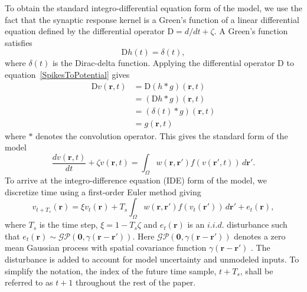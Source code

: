 \documentclass[conference]{IEEEtran}
\begin{document}
To obtain the standard integro-differential equation form of the model, we use the fact that the synaptic response kernel is a Green's function of a linear differential equation defined by the differential operator $\textrm{D}=d/dt + \zeta$. A Green's function satisfies
\begin{equation}
	\label{GreensFuncDef} \textrm{D}h\left( t \right) = \delta \left( t \right), 
\end{equation} 
where $\delta(t)$ is the Dirac-delta function. Applying the differential operator $\textrm{D}$ to equation~\ref{SpikesToPotential} gives
\begin{align}
 \textrm{D}v\left(\mathbf r,t\right)&= \textrm{D}\left(h\ast g\right)\left(\mathbf r,t\right)\\
&=\left(\textrm{D}h\ast g\right)\left(\mathbf r,t\right)\\
&=\left(\delta \left(t\right)\ast g\right)\left(\mathbf r,t\right)\\
&=g\left(\mathbf r,t\right)
\end{align}
where $\ast$ denotes the convolution operator. This gives the standard form of the model
\begin{equation}
	\label{FinalFormContinuous} 
	\frac{dv\left( \mathbf{r},t \right)}{dt} + \zeta v\left( \mathbf{r},t \right) = \int_\Omega {w\left( \mathbf{r},\mathbf{r}' \right)f\left( {v\left( \mathbf{r}',t \right)} \right)\, d\mathbf{r}'}. 
\end{equation}
To arrive at the integro-difference equation (IDE) form of the model, we discretize time using a first-order Euler method giving 
\begin{equation}
	\label{eq:DiscreteTimeModel} 
	v_{t+T_s}\left(\mathbf{r}\right) = 
	\xi v_t\left(\mathbf{r}\right) + 
	T_s \int_\Omega { 
	    w\left(\mathbf{r},\mathbf{r}'\right)
	    f\left(v_t\left(\mathbf{r}'\right)\right) 
	\, d\mathbf{r}'} 
	+ e_t\left(\mathbf{r}\right), 
\end{equation}
where $T_s$ is the time step, $\xi = 1-T_s\zeta $ and $e_t(\mathbf{r})$ is an $i.i.d.$ disturbance such that $e_t(\mathbf{r})\sim\mathcal{GP}(\mathbf 0,\gamma(\mathbf{r}-\mathbf{r}'))$. Here $\mathcal{GP}(\mathbf 0,\gamma(\mathbf{r}-\mathbf{r}'))$ denotes a zero mean Gaussian process with spatial covariance function $\gamma(\mathbf{r}-\mathbf{r}')$ \cite{Rasmussen2005}. The disturbance is added to account for model uncertainty and unmodeled inputs. To simplify the notation, the index of the future time sample, $t+T_s$, shall be referred to as $t+1$ throughout the rest of the paper. 
\end{document}
